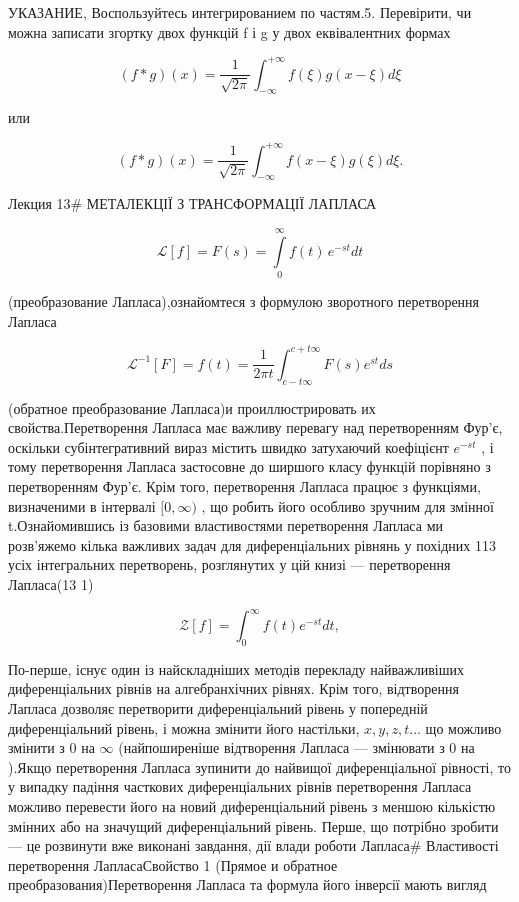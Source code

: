 \documentclass[
  ukrainian,
]{article}
\begin{document}
УКАЗАНИЕ, Воспользуйтесь интегрированием по частям.5. Перевірити, чи
можна записати згортку двох функцій f і g у двох еквівалентних формах

\[
(f * g)(x) = \frac{1}{\sqrt{2\pi}} \int_{-\infty}^{+\infty} f(\xi) g(x - \xi) d\xi
\]

или

\[
(f * g)(x) = \frac{1}{\sqrt{2\pi}} \int_{-\infty}^{+\infty} f(x-\xi) g(\xi) d\xi.
\]

Лекция 13\# МЕТАЛЕКЦІЇ З ТРАНСФОРМАЦІЇ ЛАПЛАСА

\[
\mathscr{L}[f] = F(s) = \int\limits_0^\infty f(t)\,e^{-st}dt
\]

(преобразование Лапласа),ознайомтеся з формулою зворотного перетворення
Лапласа

\[
\mathscr{L}^{-1}[F] = f(t) = \frac{1}{2\pi t} \int_{c-t\infty}^{c+t\infty} F(s) e^{st} ds
\]

(обратное преобразование Лапласа)и проиллюстрировать их
свойства.Перетворення Лапласа має важливу перевагу над перетворенням
Фур'є, оскільки субінтегративний вираз містить швидко затухаючий
коефіцієнт \(e^{-st}\) , і тому перетворення Лапласа застосовне до
ширшого класу функцій порівняно з перетворенням Фур'є. Крім того,
перетворення Лапласа працює з функціями, визначеними в інтервалі
\([0, \infty)\) , що робить його особливо зручним для змінної
t.Ознайомившись із базовими властивостями перетворення Лапласа ми
розв'яжемо кілька важливих задач для диференціальних рівнянь у похідних
113 усіх інтегральних перетворень, розглянутих у цій книзі ---
перетворення Лапласа(13 1)

\[
\mathscr{Z}[f] = \int_{0}^{\infty} f(t) e^{-st} dt,
\]

По-перше, існує один із найскладніших методів перекладу найважливіших
диференціальних рівнів на алгебранхічних рівнях. Крім того, відтворення
Лапласа дозволяє перетворити диференціальний рівень у попередній
диференціальний рівень, і можна змінити його настільки,
\(x, y, z, t \ldots\) що можливо змінити з 0 на \(\infty\)
(найпоширеніше відтворення Лапласа --- змінювати з 0 на ).Якщо
перетворення Лапласа зупинити до найвищої диференціальної рівності, то у
випадку падіння часткових диференціальних рівнів перетворення Лапласа
можливо перевести його на новий диференціальний рівень з меншою
кількістю змінних або на значущий диференціальний рівень. Перше, що
потрібно зробити --- це розвинути вже виконані завдання, дії влади
роботи Лапласа\# Властивості перетворення ЛапласаСвойство 1 (Прямое и
обратное преобразования)Перетворення Лапласа та формула його інверсії
мають вигляд
\end{document}
